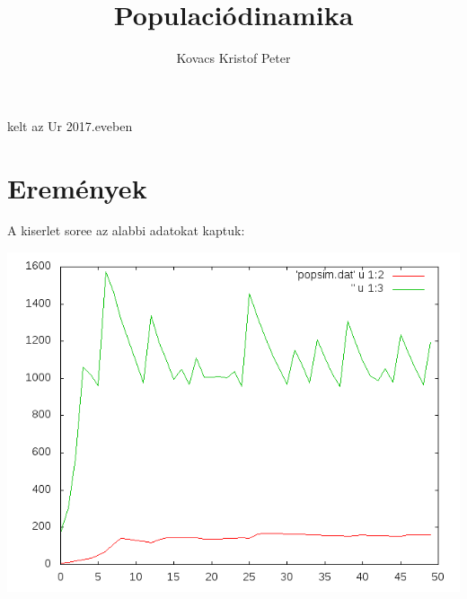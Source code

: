 \documentclass[]{article}
\title{Populaciódinamika}
\author{Kovacs Kristof Peter}
\begin{document}
	kelt az Ur 2017.eveben
\section{Eremények}
	\par A kiserlet soree az alabbi adatokat kaptuk:	
	\par
	\includegraphics{build/eredmenyek.png}
\end{document}
